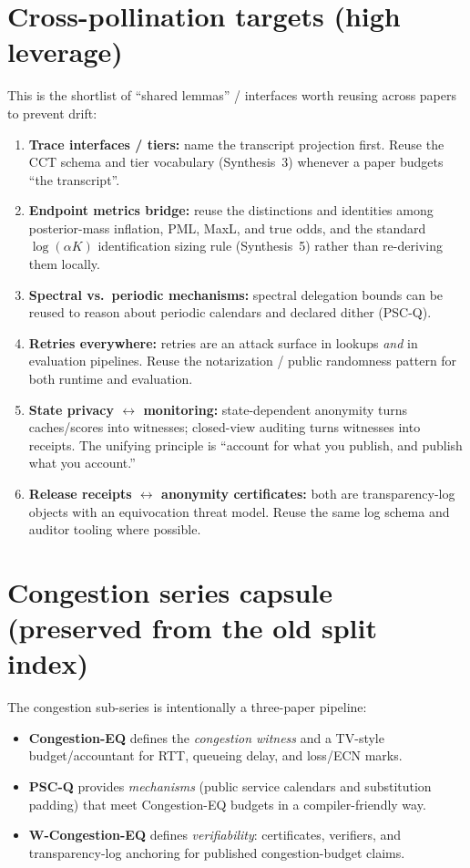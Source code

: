 \documentclass[11pt]{article}
\begin{document}
\section{Cross-pollination targets (high leverage)}
This is the shortlist of ``shared lemmas'' / interfaces worth reusing across papers to prevent drift:
\begin{enumerate}[leftmargin=*]
\item \textbf{Trace interfaces / tiers:} name the transcript projection first. Reuse the CCT schema and tier vocabulary (Synthesis~3) whenever a paper budgets ``the transcript''.
\item \textbf{Endpoint metrics bridge:} reuse the distinctions and identities among posterior-mass inflation, PML, MaxL, and true odds, and the standard $\log(\alpha K)$ identification sizing rule (Synthesis~5) rather than re-deriving them locally.
\item \textbf{Spectral vs.\ periodic mechanisms:} spectral delegation bounds can be reused to reason about periodic calendars and declared dither (PSC-Q).
\item \textbf{Retries everywhere:} retries are an attack surface in lookups \emph{and} in evaluation pipelines.
  Reuse the notarization / public randomness pattern for both runtime and evaluation.
\item \textbf{State privacy $\leftrightarrow$ monitoring:} state-dependent anonymity turns caches/scores into witnesses; closed-view auditing turns witnesses into receipts.
  The unifying principle is ``account for what you publish, and publish what you account.''
\item \textbf{Release receipts $\leftrightarrow$ anonymity certificates:} both are transparency-log objects with an equivocation threat model.
  Reuse the same log schema and auditor tooling where possible.
\end{enumerate}


\section{Congestion series capsule (preserved from the old split index)}
The congestion sub-series is intentionally a three-paper pipeline:
\begin{itemize}[leftmargin=*]
\item \textbf{Congestion-EQ} defines the \emph{congestion witness} and a TV-style budget/accountant for RTT, queueing delay, and loss/ECN marks.
\item \textbf{PSC-Q} provides \emph{mechanisms} (public service calendars and substitution padding) that meet Congestion-EQ budgets in a compiler-friendly way.
\item \textbf{W-Congestion-EQ} defines \emph{verifiability}: certificates, verifiers, and transparency-log anchoring for published congestion-budget claims.
\end{itemize}
\end{document}
